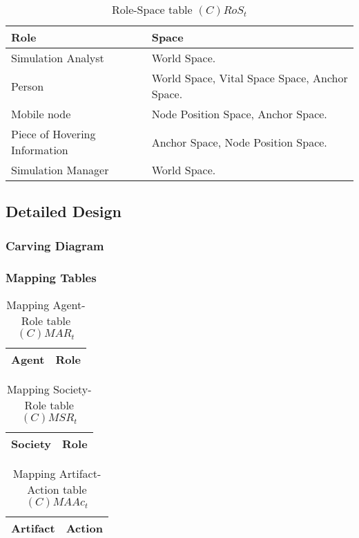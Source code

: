 \begin{table}[H]
	\centering
	\begin{tabular}{|p{4cm}|p{8cm}|}
			\hline
			\textbf{Role} & \textbf{Space} \\
			\hline
			Simulation Analyst & World Space. \\
			\hline
			Person & World Space, Vital Space Space, Anchor Space. \\
			\hline
			Mobile node & Node Position Space, Anchor Space. \\
			\hline
			Piece of Hovering Information & Anchor Space, Node Position Space. \\
			\hline
			Simulation Manager & World Space. \\
			\hline
		\end{tabular}
	\caption{Role-Space table $(C)RoS_t$}
	\label{tab:cost}
\end{table}


\subsection{Detailed Design}

\subsubsection{Carving Diagram}

\subsubsection{Mapping Tables}

\begin{table}[H]
	\centering
	\begin{tabular}{|p{4cm}|p{8cm}|}
			\hline
			\textbf{Agent} & \textbf{Role} \\
			\hline
			\hline
		\end{tabular}
	\caption{Mapping Agent-Role table $(C)MAR_t$}
	\label{tab:cmart}
\end{table}

\begin{table}[H]
	\centering
	\begin{tabular}{|p{4cm}|p{8cm}|}
			\hline
			\textbf{Society} & \textbf{Role} \\
			\hline
			\hline
		\end{tabular}
	\caption{Mapping Society-Role table $(C)MSR_t$}
	\label{tab:cmsrt}
\end{table}

\begin{table}[H]
	\centering
	\begin{tabular}{|p{4cm}|p{8cm}|}
			\hline
			\textbf{Artifact} & \textbf{Action} \\
			\hline
			\hline
		\end{tabular}
	\caption{Mapping Artifact-Action table $(C)MAAc_t$}
	\label{tab:cmaact}
\end{table}

